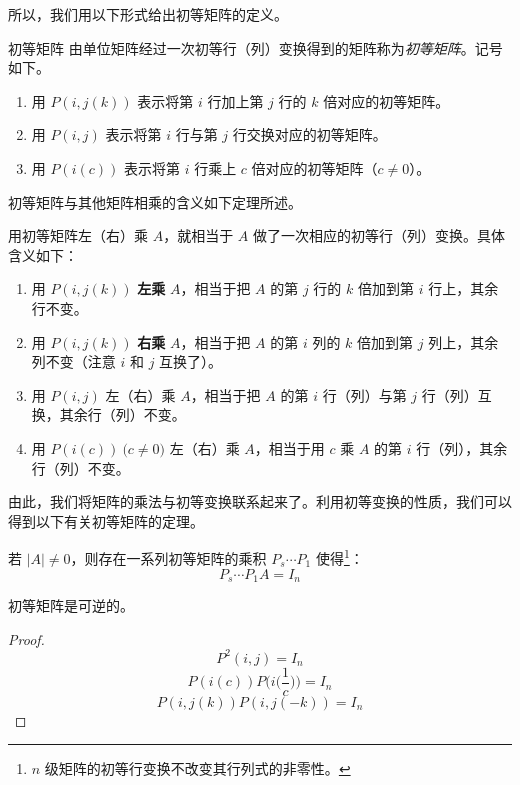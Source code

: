 所以，我们用以下形式给出初等矩阵的定义。

\begin{definition}{初等矩阵}
	由单位矩阵经过一次初等行（列）变换得到的矩阵称为\emph{初等矩阵}。记号如下。

	\begin{enumerate}
		\item 用 $P(i, j(k))$ 表示将第 $i$ 行加上第 $j$ 行的 $k$ 倍对应的初等矩阵。
		\item 用 $P(i, j)$ 表示将第 $i$ 行与第 $j$ 行交换对应的初等矩阵。
		\item 用 $P(i(c))$ 表示将第 $i$ 行乘上 $c$ 倍对应的初等矩阵（$c \ne 0$）。
	\end{enumerate}
\end{definition}

初等矩阵与其他矩阵相乘的含义如下定理所述。

\begin{theorem}
	用初等矩阵左（右）乘 $A$，就相当于 $A$ 做了一次相应的初等行（列）变换。具体含义如下：
	\begin{enumerate}
		\item 用 $P(i, j(k))$ \textbf{左乘} $A$，相当于把 $A$ 的第 $j$ 行的 $k$ 倍加到第 $i$ 行上，其余行不变。
		\item 用 $P(i, j(k))$ \textbf{右乘} $A$，相当于把 $A$ 的第 $i$ 列的 $k$ 倍加到第 $j$ 列上，其余列不变（注意 $i$ 和 $j$ 互换了）。
		\item 用 $P(i, j)$ 左（右）乘 $A$，相当于把 $A$ 的第 $i$ 行（列）与第 $j$ 行（列）互换，其余行（列）不变。
		\item 用 $P(i(c)) \pod{c \ne 0}$ 左（右）乘 $A$，相当于用 $c$ 乘 $A$ 的第 $i$ 行（列），其余行（列）不变。
	\end{enumerate}
\end{theorem}

由此，我们将矩阵的乘法与初等变换联系起来了。利用初等变换的性质，我们可以得到以下有关初等矩阵的定理。

\begin{theorem}
	若 $|A| \ne 0$，则存在一系列初等矩阵的乘积 $P_s \cdots P_1$ 使得\footnote{$n$ 级矩阵的初等行变换不改变其行列式的非零性。}：
	$$
	P_s \cdots P_1 A = I_n
	$$
\end{theorem}

\begin{theorem}
	初等矩阵是可逆的。
\end{theorem}

\begin{proof}
	$$
	P^2(i, j) = I_n
	$$$$
	P(i(c)) P \biggl( i \biggl( \frac{1}{c} \biggr) \biggr) = I_n
	$$$$
	P(i, j(k)) P(i, j(-k)) = I_n
	$$
\end{proof}


